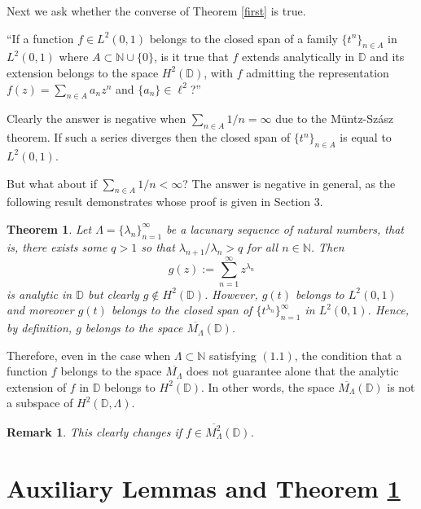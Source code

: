 \documentclass[11pt, a4paper]{article}
\newtheorem{theorem}{Theorem}[section]
\newtheorem{remark}{Remark}[section]
\begin{document}
Next we ask whether the converse of Theorem \ref{first} is true.

``If a function $f\in L^2(0,1)$  belongs to the closed span of a family $\{t^n\}_{n\in A}$ in $L^2 (0,1)$ where
$A\subset \mathbb{N}\cup\{0\}$, is it true that $f$ extends analytically in $\mathbb{D}$ and its extension
belongs to the space $H^2 (\mathbb{D})$, with $f$ admitting the representation $f(z)=\sum_{n\in A} a_n z^{n}$ and $\{a_n\}\in \ell^2$?''\\



\smallskip



Clearly the answer is negative when $\sum_{n\in A}1/n=\infty$ due to the M\"{u}ntz-Sz\'{a}sz theorem.
If such a series diverges then the closed span of $\{t^n\}_{n\in A}$ is equal to $L^2(0,1)$.

But what about if $\sum_{n\in A}1/n<\infty$? The answer is negative in general, as the following result demonstrates whose proof
is given in Section 3.
\begin{theorem}\label{lacunary}
Let $\Lambda=\{\lambda_n\}_{n=1}^{\infty}$ be a lacunary sequence of natural numbers, that is,
there exists some $q>1$ so that $\lambda_{n+1}/\lambda_n>q$ for all $n\in\mathbb{N}$. Then
\[
g(z):=\sum_{n=1}^{\infty} z^{\lambda_n}
\]
is analytic in $\mathbb{D}$ but clearly $g\notin H^2 (\mathbb{D})$. However,
$g(t)$ belongs to $L^2 (0,1)$ and moreover $g(t)$ belongs to the closed span of $\{t^{\lambda_n}\}_{n=1}^{\infty}$ in $L^2 (0,1)$.
Hence, by definition, $g$ belongs to the space $\overline{M_{\Lambda}}(\mathbb{D})$.
\end{theorem}


Therefore, even in the case when $\Lambda\subset\mathbb{N}$ satisfying $(1.1)$, the condition that a function $f$ belongs to the space
$\overline{M_{\Lambda}}$ does not guarantee alone that the analytic extension of $f$ in $\mathbb{D}$ belongs to $H^2 (\mathbb{D})$.
In other words, the space $\overline{M_{\Lambda}}(\mathbb{D})$ is not a subspace of $H^2 (\mathbb{D}, \Lambda)$.
\begin{remark}
This clearly changes if $f\in \overline{M^2_{\Lambda}}(\mathbb{D})$.
\end{remark}



\section{Auxiliary Lemmas and Theorem \ref{lacunary}}
\setcounter{equation}{0}
\end{document}
